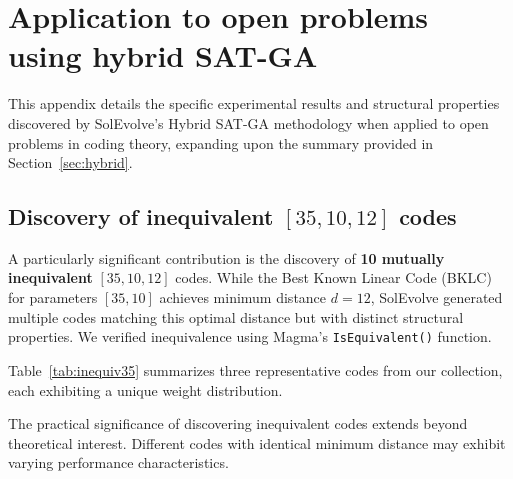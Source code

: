 \section{Application to open problems using hybrid SAT-GA}\label{sec:app_hybrid_app}

This appendix details the specific experimental results and structural properties discovered by SolEvolve's Hybrid SAT-GA methodology when applied to open problems in coding theory, expanding upon the summary provided in Section~\ref{sec:hybrid}.

\subsection{Discovery of inequivalent $[35,10,12]$ codes}
A particularly significant contribution is the discovery of \textbf{10 mutually inequivalent} $[35,10,12]$ codes. While the Best Known Linear Code (BKLC) for parameters $[35,10]$ achieves minimum distance $d=12$, SolEvolve generated multiple codes matching this optimal distance but with distinct structural properties. We verified inequivalence using Magma's \texttt{IsEquivalent()} function.

Table~\ref{tab:inequiv35} summarizes three representative codes from our collection, each exhibiting a unique weight distribution.

\begin{table}[h!]
\centering
\caption{Inequivalent binary $[35,10,12]$ codes discovered by SolEvolve. All achieve the optimal BKLC distance but with distinct weight distributions. $A_i$ denotes the number of codewords of Hamming weight $i$ in the code.}
\label{tab:inequiv35}
\end{table}

\noindent The practical significance of discovering inequivalent codes extends beyond theoretical interest. Different codes with identical minimum distance may exhibit varying performance characteristics.

